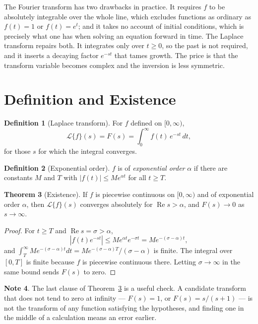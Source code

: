 \documentclass[12pt,a4paper]{report}
\theoremstyle{definition}
\newtheorem{thm}{Theorem}[section]
\newtheorem{defn}[thm]{Definition}
\newtheorem{note}[thm]{Note}
\theoremstyle{plain}
\begin{document}
The Fourier transform has two drawbacks in practice. It requires $f$ to be
absolutely integrable over the whole line, which excludes functions as ordinary
as $f(t)=1$ or $f(t)=e^{t}$; and it takes no account of initial conditions,
which is precisely what one has when solving an equation forward in time. The
Laplace transform repairs both. It integrates only over $t\geq0$, so the past is
not required, and it inserts a decaying factor $e^{-st}$ that tames growth. The
price is that the transform variable becomes complex and the inversion is less
symmetric.

\section{Definition and Existence}

\begin{defn}[Laplace transform]
For $f$ defined on $[0,\infty)$,
$$\mathcal{L}\{f\}(s) = F(s) = \int^{\infty}_{0}f(t)\,e^{-st}\,dt,$$
for those $s$ for which the integral converges.
\end{defn}

\begin{defn}[Exponential order]
$f$ is of \emph{exponential order} $\alpha$ if there are constants $M$ and $T$
with $\left|f(t)\right|\leq M e^{\alpha t}$ for all $t\geq T$.
\end{defn}

\begin{thm}[Existence]
\label{thm:laplaceexist}
If $f$ is piecewise continuous on $[0,\infty)$ and of exponential order
$\alpha$, then $\mathcal{L}\{f\}(s)$ converges absolutely for
$\operatorname{Re}s>\alpha$, and $F(s)\to0$ as $s\to\infty$.
\end{thm}

\begin{proof}
For $t\geq T$ and $\operatorname{Re}s = \sigma>\alpha$,
$$\left|f(t)e^{-st}\right| \leq M e^{\alpha t}e^{-\sigma t}
= M e^{-(\sigma-\alpha)t},$$
and $\int^{\infty}_{T}Me^{-(\sigma-\alpha)t}dt = Me^{-(\sigma-\alpha)T}/(\sigma-\alpha)$
is finite. The integral over $[0,T]$ is finite because $f$ is piecewise
continuous there. Letting $\sigma\to\infty$ in the same bound sends $F(s)$ to
zero.
\end{proof}

\begin{note}
The last clause of Theorem~\ref{thm:laplaceexist} is a useful check. A candidate
transform that does not tend to zero at infinity --- $F(s)=1$, or
$F(s)=s/(s+1)$ --- is not the transform of any function satisfying the
hypotheses, and finding one in the middle of a calculation means an error
earlier.
\end{note}
\end{document}
